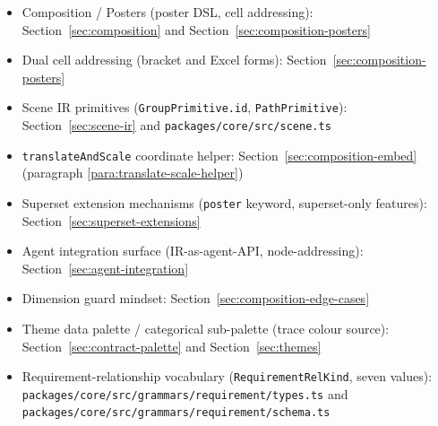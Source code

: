 \begin{itemize}
  \item Composition / Posters (poster DSL, cell addressing):
        Section~\ref{sec:composition} and Section~\ref{sec:composition-posters}
  \item Dual cell addressing (bracket and Excel forms):
        Section~\ref{sec:composition-posters}
  \item Scene IR primitives (\texttt{GroupPrimitive.id},
        \texttt{PathPrimitive}): Section~\ref{sec:scene-ir} and
        \texttt{packages/core/src/scene.ts}
  \item \texttt{translateAndScale} coordinate helper:
        Section~\ref{sec:composition-embed} (paragraph \ref{para:translate-scale-helper})
  \item Superset extension mechanisms (\texttt{poster} keyword,
        superset-only features): Section~\ref{sec:superset-extensions}
  \item Agent integration surface (IR-as-agent-API, node-addressing):
        Section~\ref{sec:agent-integration}
  \item Dimension guard mindset: Section~\ref{sec:composition-edge-cases}
  \item Theme data palette / categorical sub-palette (trace colour source):
        Section~\ref{sec:contract-palette} and Section~\ref{sec:themes}
  \item Requirement-relationship vocabulary (\texttt{RequirementRelKind},
        seven values): \texttt{packages/core/src/grammars/requirement/types.ts}
        and \texttt{packages/core/src/grammars/requirement/schema.ts}
\end{itemize}
